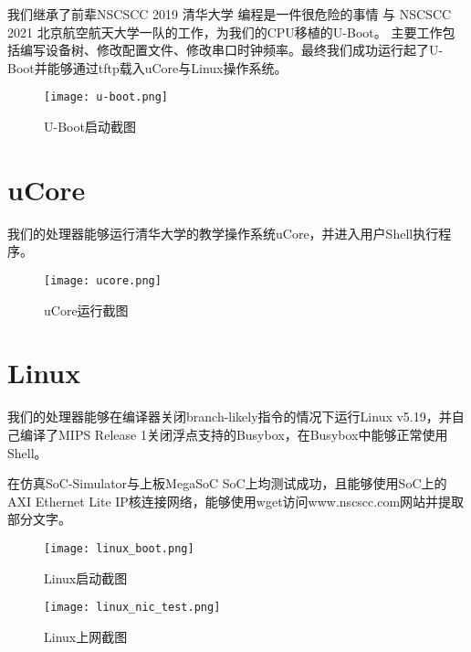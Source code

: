 我们继承了前辈NSCSCC 2019 清华大学 编程是一件很危险的事情 与 NSCSCC 2021 北京航空航天大学一队的工作，为我们的CPU移植的U-Boot。
主要工作包括编写设备树、修改配置文件、修改串口时钟频率。最终我们成功运行起了U-Boot并能够通过tftp载入uCore与Linux操作系统。

\begin{figure}[h]
    \centering
    \texttt{[image: u-boot.png]}
    \caption{U-Boot启动截图}
\end{figure}

\newpage

\section{uCore}

我们的处理器能够运行清华大学的教学操作系统uCore，并进入用户Shell执行程序。

\begin{figure}[htpb]
    \centering
    \texttt{[image: ucore.png]}
    \caption{uCore运行截图}
    \label{img:ucore}
\end{figure}

\newpage

\section{Linux}

我们的处理器能够在编译器关闭branch-likely指令的情况下运行Linux v5.19，并自己编译了MIPS Release 1关闭浮点支持的Busybox，在Busybox中能够正常使用Shell。

在仿真SoC-Simulator与上板MegaSoC SoC上均测试成功，且能够使用SoC上的AXI Ethernet Lite IP核连接网络，能够使用wget访问www.nscscc.com网站并提取部分文字。

\begin{figure}[h]
    \centering
    \texttt{[image: linux\_boot.png]}
    \caption{Linux启动截图}
    \label{img:linux_boot}
\end{figure}

\begin{figure}[h]
    \centering
    \texttt{[image: linux\_nic\_test.png]}
    \caption{Linux上网截图}
    \label{img:linux_nic_test}
\end{figure}